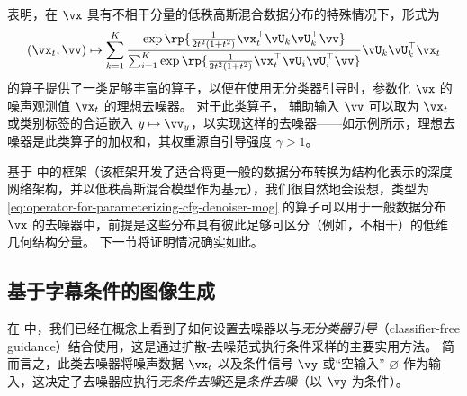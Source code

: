\documentclass[../../book-main_zh.tex]{subfiles}
\begin{document}
 表明，在 $\vx$ 具有不相干分量的低秩高斯混合数据分布的特殊情况下，形式为
\begin{equation}\label{eq:operator-for-parameterizing-cfg-denoiser-mog}
    (\vx_t, \vv) \mapsto
    \sum_{k = 1}^{K}\frac{
        \exp\rp{\frac{1}{2t^{2}(1
        + t^{2})}\vx_t^\top \vU_k \vU_k^\top \vv}
    }
    {
        \sum_{i
        = 1}^{K}\exp\rp{\frac{1}{2t^{2}(1
        + t^{2})}\vx_t^\top \vU_i \vU_i^\top \vv}
    }
    \vU_{k}\vU_{k}^{\top}\vx_t
\end{equation}
的算子提供了一类足够丰富的算子，以便在使用无分类器引导时，参数化 $\vx$ 的噪声观测值 $\vx_t$ 的理想去噪器。
对于此类算子，
辅助输入 $\vv$ 可以取为 $\vx_t$ 或类别标签的合适嵌入 $y \mapsto \vv_y$，以实现这样的去噪器——如示例所示，理想去噪器是此类算子的加权和，其权重源自引导强度 $\gamma>1$。

基于  中的框架（该框架开发了适合将更一般的数据分布转换为结构化表示的深度网络架构，并以低秩高斯混合模型作为基元），我们很自然地会设想，类型为
\eqref{eq:operator-for-parameterizing-cfg-denoiser-mog} 的算子可以用于一般数据分布 $\vx$ 的去噪器中，前提是这些分布具有彼此足够可区分（例如，不相干）的低维几何结构分量。
下一节将证明情况确实如此。

\subsection{基于字幕条件的图像生成}\label{sub:text-cond}
在  中，我们已经在概念上看到了如何设置去噪器以与\textit{无分类器引导}（classifier-free guidance）结合使用，这是通过扩散-去噪范式执行条件采样的主要实用方法。
简而言之，此类去噪器将噪声数据 $\vx_t$ 以及条件信号 $\vy$ 或“空输入” $\varnothing$ 作为输入，这决定了去噪器应执行\textit{无条件去噪}还是\textit{条件去噪}（以 $\vy$ 为条件）。
\end{document}
